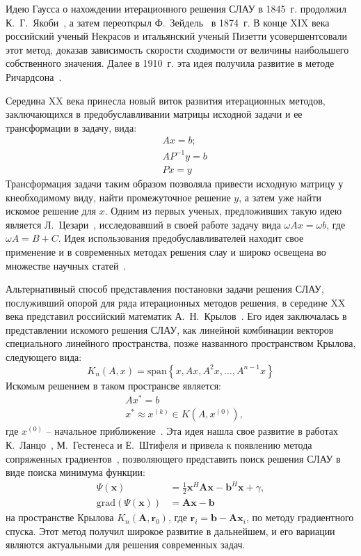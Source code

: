 Идею Гаусса о нахождении итерационного решения СЛАУ в 1845~г. продолжил К.~Г.~Якоби~\cite{w:jacobi}, а затем переоткрыл Ф.~Зейдель~\cite{w:seidel} в 1874~г. В конце XIX века российский ученый Некрасов и итальянский ученый Пизетти усовершентсовали этот метод, доказав зависимость скорости сходимости от величины наибольшего собственного значения. Далее в 1910~г. эта идея получила развитие в методе Ричардсона~\cite{rch_matrix}.


Середина XX века принесла новый виток развития итерационных методов, заключающихся в предобуславливании матрицы исходной задачи и ее трансформации в задачу, вида:
\begin{align*}
	&Ax = b; \\
	&AP^{-1}y = b \\
	&Px = y
\end{align*}
Трансформация задачи таким образом позволяла привести исходную матрицу у кнеобходимому виду, найти промежуточное решение $y$, а затем уже найти искомое решение для $x$. Одним из первых ученых, предложивших такую идею является Л.~Цезари~\cite{cesari_matrix}, исследовавший в своей работе задачу вида $\omega Ax = \omega b$, где $\omega A = B + C$. Идея использования предобуславливателей находит свое применение и в современных методах решения слау и широко освещена во множестве научных статей~\cite{w:preconditioner}.


Альтернативный способ представления постановки задачи решения СЛАУ, послуживший опорой для ряда итерационных методов решения, в середине XX века представил российский математик А.~Н.~Крылов~\cite{w:krylov}. Его идея заключалась в представлении искомого решения СЛАУ, как линейной комбинации векторов специального линейного пространства, позже названного пространством Крылова, следующего вида:
\[
	K_n(A, x) = \mathrm{span}\left\{x, Ax, A^2x, \dots, A^{n-1}x\right\}
\]
Искомым решением в таком пространсве является:
\begin{align*}
	&Ax^* = b\\
	&x^* \approx x^{(k)} \in K(A, x^{(0)}),
\end{align*}
где $x^{(0)}$ -- начальное приближение~\cite{krylovBook}. Эта идея нашла свое развитие в работах К.~Ланцо~\cite{w:lanzcos}, М.~Гестенеса и Е.~Штифеля и привела к появлению метода сопряженных градиентов~\cite{CG}, позволяющего представить поиск решения СЛАУ в виде поиска минимума функции:
\begin{align*}
	\Psi(\mathbf{x}) &= \frac{1}{2}\mathbf{x}^H \mathbf{A} \mathbf{x} - \mathbf{b}^H \mathbf{x} + \gamma, \\
	\mathrm{grad}\left(\Psi(\mathbf{x})\right) &= \mathbf{A}\mathbf{x} - \mathbf{b}
\end{align*}
на пространстве Крылова $K_n(\mathbf{A}, \mathbf{r}_0)$, где $\mathbf{r}_i = \mathbf{b} - \mathbf{A}\mathbf{x}_i$, по методу градиентного спуска. Этот метод получил широкое развитие в дальнейшем, и его вариации являются актуальными для решения современных задач.


